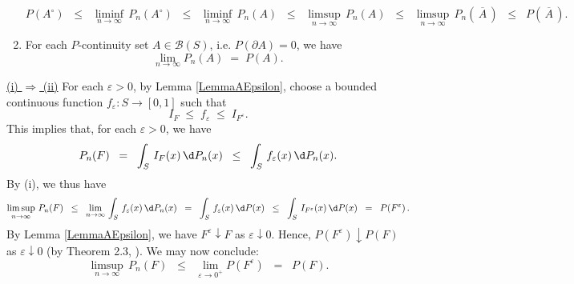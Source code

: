 \begin{theorem}
\begin{enumerate}
\begin{equation*}
		P\!\left(A^{\circ}\right)
		\;\;\leq\;\; \liminf_{n\rightarrow\infty}\,P_{n}\!\left(A^{\circ}\right)
		\;\;\leq\;\; \liminf_{n\rightarrow\infty}\,P_{n}\!\left(A\right)
		\;\;\leq\;\; \limsup_{n\rightarrow\infty}\,P_{n}\!\left(A\right)
		\;\;\leq\;\; \limsup_{n\rightarrow\infty}\,P_{n}\!\left(\,\overline{A}\,\right)
		\;\;\leq\;\; P\!\left(\,\overline{A}\,\right).
		\end{equation*}
\item	For each $P$-continuity set $A \in \mathcal{B}(S)$, i.e. $P(\partial A) = 0$, we have
		\begin{equation*}
		\lim_{n\rightarrow\infty}P_{n}(A) \;=\; P(A).
		\end{equation*}
\end{enumerate}
\end{theorem}

\proof
\vskip 0.3cm
\noindent
\underline{(i) $\Longrightarrow$ (ii)}
\vskip 0.2cm
\noindent
For each $\varepsilon > 0$, by Lemma \ref{LemmaAEpsilon}, choose
a bounded continuous function $f_{\varepsilon} : S \longrightarrow [0,1]$ such that
\begin{equation*}
I_{F} \; \leq \; f_{\varepsilon} \; \leq \; I_{F^{\varepsilon}}.
\end{equation*}
This implies that, for each $\varepsilon > 0$, we have
\begin{equation*}
P_{n}(F)
\;\; = \;\; \int_{S}\,I_{F}(x)\,\d P_{n}(x)
\;\; \leq \;\; \int_{S}\,f_{\varepsilon}(x)\,\d P_{n}(x).
\end{equation*}
By (i), we thus have
\begin{equation*}
\limsup_{n\rightarrow\infty}\,P_{n}(F)
\;\;\leq\;\; \lim_{n\rightarrow\infty}\,\int_{S}\,f_{\varepsilon}(x)\,\d P_{n}(x)
\;\;=\;\; \int_{S}\,f_{\varepsilon}(x)\,\d P(x)
\;\;\leq\;\; \int_{S}\,I_{F^{\varepsilon}}(x)\,\d P(x)
\;\;=\;\; P\!\left(F^{\varepsilon}\right).
\end{equation*}
By Lemma \ref{LemmaAEpsilon}, we have $F^{\varepsilon}\downarrow F$ as $\varepsilon\downarrow 0$.
Hence, $P\!\left(F^{\varepsilon}\right)\downarrow P(F)$ as $\varepsilon\downarrow 0$ (by Theorem 2.3, \cite{JacodProtter}).
We may now conclude:
\begin{equation*}
\limsup_{n\rightarrow\infty}\,P_{n}(F)
\;\;\leq\;\; \lim_{\varepsilon\rightarrow 0^{+}}P\!\left(F^{\varepsilon}\right)
\;\;=\;\; P\!\left(F\right).
\end{equation*}

